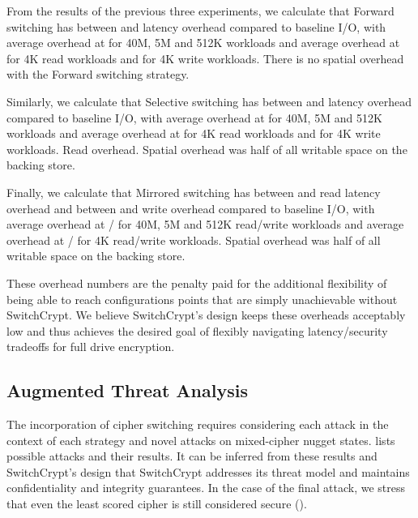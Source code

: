 From the results of the previous three experiments, we calculate that Forward
switching has between  and  latency overhead compared to
baseline I/O, with average overhead at  for 40M, 5M and 512K workloads
and average overhead at  for 4K read workloads and  for 4K
write workloads. There is no spatial overhead with the Forward switching
strategy.

Similarly, we calculate that Selective switching has between  and
 latency overhead compared to baseline I/O, with average overhead at
 for 40M, 5M and 512K workloads and average overhead at  for
4K read workloads and  for 4K write workloads. Read overhead. Spatial
overhead was half of all writable space on the backing store.

Finally, we calculate that Mirrored switching has between  and 
read latency overhead and between  and  write overhead compared
to baseline I/O, with average overhead at / for 40M, 5M and
512K read/write workloads and average overhead at / for 4K
read/write workloads. Spatial overhead was half of all writable space on the
backing store.

These overhead numbers are the penalty paid for the additional flexibility of
being able to reach configurations points that are simply unachievable without
SwitchCrypt. We believe SwitchCrypt's design keeps these overheads acceptably
low and thus achieves the desired goal of flexibly navigating latency/security
tradeoffs for full drive encryption.

\subsection{Augmented Threat Analysis}\label{subsec:4}

The incorporation of cipher switching requires considering each attack in the
context of each strategy and novel attacks on mixed-cipher nugget states.
 lists possible attacks and their results. It can be inferred
from these results and SwitchCrypt's design that SwitchCrypt addresses its
threat model and maintains confidentiality and integrity guarantees. In the case
of the final attack, we stress that even the least scored cipher is still
considered secure ().

